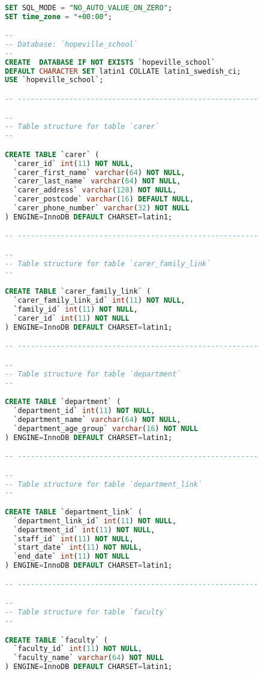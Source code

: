 \begin{lstlisting}[language=sql, caption=Database Generation Script, style=mystyle]

SET SQL_MODE = "NO_AUTO_VALUE_ON_ZERO";
SET time_zone = "+00:00";

--
-- Database: `hopeville_school`
--
CREATE  DATABASE IF NOT EXISTS `hopeville_school` 
DEFAULT CHARACTER SET latin1 COLLATE latin1_swedish_ci;
USE `hopeville_school`;

-- --------------------------------------------------------

--
-- Table structure for table `carer`
--

CREATE TABLE `carer` (
  `carer_id` int(11) NOT NULL,
  `carer_first_name` varchar(64) NOT NULL,
  `carer_last_name` varchar(64) NOT NULL,
  `carer_address` varchar(128) NOT NULL,
  `carer_postcode` varchar(16) DEFAULT NULL,
  `carer_phone_number` varchar(32) NOT NULL
) ENGINE=InnoDB DEFAULT CHARSET=latin1;

-- --------------------------------------------------------

--
-- Table structure for table `carer_family_link`
--

CREATE TABLE `carer_family_link` (
  `carer_family_link_id` int(11) NOT NULL,
  `family_id` int(11) NOT NULL,
  `carer_id` int(11) NOT NULL
) ENGINE=InnoDB DEFAULT CHARSET=latin1;

-- --------------------------------------------------------

--
-- Table structure for table `department`
--

CREATE TABLE `department` (
  `department_id` int(11) NOT NULL,
  `department_name` varchar(64) NOT NULL,
  `department_age_group` varchar(16) NOT NULL
) ENGINE=InnoDB DEFAULT CHARSET=latin1;

-- --------------------------------------------------------

--
-- Table structure for table `department_link`
--

CREATE TABLE `department_link` (
  `department_link_id` int(11) NOT NULL,
  `department_id` int(11) NOT NULL,
  `staff_id` int(11) NOT NULL,
  `start_date` int(11) NOT NULL,
  `end_date` int(11) NOT NULL
) ENGINE=InnoDB DEFAULT CHARSET=latin1;

-- --------------------------------------------------------

--
-- Table structure for table `faculty`
--

CREATE TABLE `faculty` (
  `faculty_id` int(11) NOT NULL,
  `faculty_name` varchar(64) NOT NULL
) ENGINE=InnoDB DEFAULT CHARSET=latin1;


\end{lstlisting}
